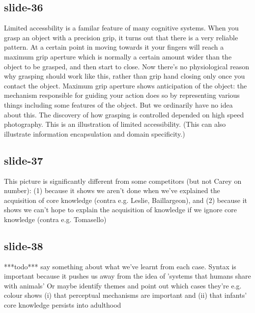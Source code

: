 \documentclass[12pt,\papersize]{extarticle}
\begin{document}
\subsection{slide-36}
Limited accessbility is a familar feature of many cognitive systems.
When you grasp an object with a precision grip, it turns out that there is a very reliable pattern.
At a certain point in moving towards it your fingers will reach a maximum grip aperture which is normally a certain amount wider than the object to be grasped, and then start to close.
Now there's no physiological reason why grasping should work like this, rather than grip hand closing only once you contact the object.
Maximum grip aperture shows anticipation of the object: the mechanism responsible for guiding your action does so by representing various things including some features of the object.
But we ordinarily have no idea about this.
The discovery of how grasping is controlled depended on high speed photography.
This is an illustration of limited accessibility.
(This can also illustrate information encapsulation and domain specificity.)
 
 
\subsection{slide-37}
This picture is significantly different from some competitors (but not Carey on number):
(1) because it shows we aren't done when we've explained the acquisition of core knowledge (contra e.g. Leslie, Baillargeon), and
(2) because it shows we can't hope to explain the acquisition of knowledge if we ignore core knowledge (contra e.g. Tomasello)
 
 
\subsection{slide-38}
***todo*** say something about what we've learnt from each case.
Syntax is important because it pushes us away from the idea of 'systems that humans share with animals' \citep[p.\ 2784]{spelke:2012_core}
Or maybe identify themes and point out which cases they're
e.g. colour shows (i) that perceptual mechanisms are important and (ii) that infants' core knowledge persists into adulthood
 
 
\end{document}
